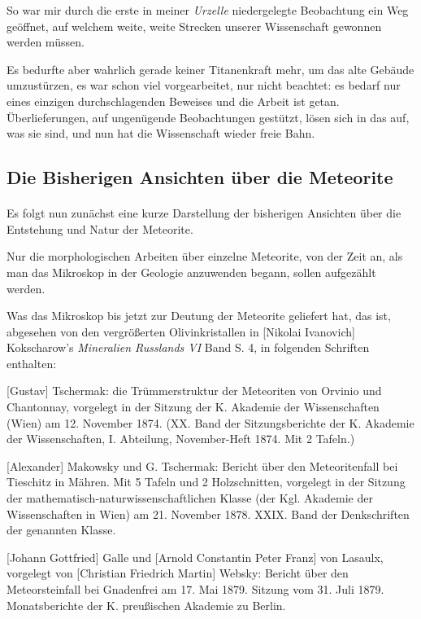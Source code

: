 \documentclass[a4paper, 12pt, oneside]{article}
\begin{document}
So war mir durch die erste in meiner \emph{Urzelle} niedergelegte Beobachtung ein Weg geöffnet, auf welchem weite, weite Strecken unserer Wissenschaft gewonnen werden müssen.

Es bedurfte aber wahrlich gerade keiner Titanenkraft mehr, um das alte Gebäude umzustürzen, es war schon viel vorgearbeitet, nur nicht beachtet: es bedarf nur eines einzigen durchschlagenden Beweises und die Arbeit ist getan. Überlieferungen, auf ungenügende Beobachtungen gestützt, lösen sich in das auf, was sie sind, und nun hat die Wissenschaft wieder freie Bahn.
\clearpage
\subsection{Die Bisherigen Ansichten über die Meteorite}
\paragraph{}
Es folgt nun zunächst eine kurze Darstellung der bisherigen Ansichten über die Entstehung und Natur der Meteorite.

Nur die morphologischen Arbeiten über einzelne Meteorite, von der Zeit an, als man das Mikroskop in der Geologie anzuwenden begann, sollen aufgezählt werden.

Was das Mikroskop bis jetzt zur Deutung der Meteorite geliefert hat, das ist, abgesehen von den vergrößerten Olivinkristallen in [Nikolai Ivanovich] Kokscharow's \emph{Mineralien Russlands VI} Band S. 4, in folgenden Schriften enthalten:

    [Gustav] Tschermak: die Trümmerstruktur der Meteoriten von Orvinio und Chantonnay, vorgelegt in der Sitzung der K. Akademie der Wissenschaften (Wien) am 12. November 1874. (XX. Band der Sitzungsberichte der K. Akademie der Wissenschaften, I. Abteilung, November-Heft 1874. Mit 2 Tafeln.)

    [Alexander] Makowsky und G. Tschermak: Bericht über den Meteoritenfall bei Tieschitz in Mähren. Mit 5 Tafeln und 2 Holzschnitten, vorgelegt in der Sitzung der mathematisch-naturwissenschaftlichen Klasse (der Kgl. Akademie der Wissenschaften in Wien) am 21. November 1878. XXIX. Band der Denkschriften der genannten Klasse.

    [Johann Gottfried] Galle und [Arnold Constantin Peter Franz] von Lasaulx, vorgelegt von [Christian Friedrich Martin] Websky: Bericht über den Meteorsteinfall bei Gnadenfrei am 17. Mai 1879. Sitzung vom 31. Juli 1879. Monatsberichte der K. preußischen Akademie zu Berlin.
\end{document}
